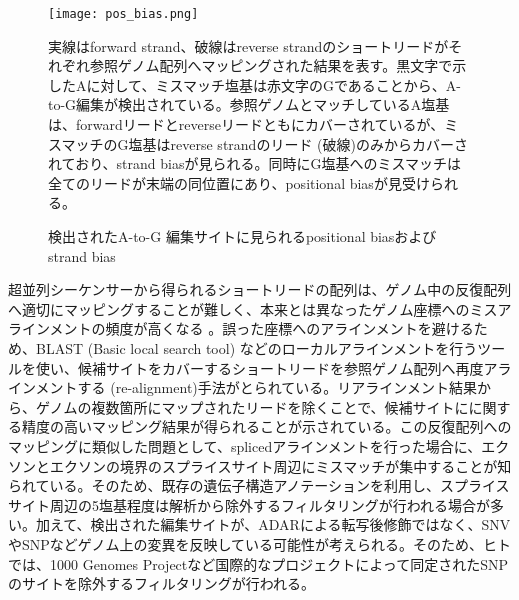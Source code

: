 \begin{figure}[!h]
	\begin{center}
		\texttt{[image: pos\_bias.png]}
	\end{center}
	\caption{検出されたA-to-G 編集サイトに見られるpositional biasおよびstrand bias}
	\begin{flushleft}
		\small{実線はforward strand、破線はreverse strandのショートリードがそれぞれ参照ゲノム配列へマッピングされた結果を表す。黒文字で示したAに対して、ミスマッチ塩基は赤文字のGであることから、A-to-G編集が検出されている。参照ゲノムとマッチしているA塩基は、forwardリードとreverseリードともにカバーされているが、ミスマッチのG塩基はreverse strandのリード (破線)のみからカバーされており、strand biasが見られる。同時にG塩基へのミスマッチは全てのリードが末端の同位置にあり、positional biasが見受けられる。}
	\end{flushleft}
	\label{fig:positional_bias}
\end{figure}

超並列シーケンサーから得られるショートリードの配列は、ゲノム中の反復配列へ適切にマッピングすることが難しく、本来とは異なったゲノム座標へのミスアラインメントの頻度が高くなる \citep{pmid22022455}。誤った座標へのアラインメントを避けるため、BLAST (Basic local search tool) \citep{altschul1990basic}などのローカルアラインメントを行うツールを使い、候補サイトをカバーするショートリードを参照ゲノム配列へ再度アラインメントする (re-alignment)手法がとられている。リアラインメント結果から、ゲノムの複数箇所にマップされたリードを除くことで、候補サイトにに関する精度の高いマッピング結果が得られることが示されている。この反復配列へのマッピングに類似した問題として、splicedアラインメントを行った場合に、エクソンとエクソンの境界のスプライスサイト周辺にミスマッチが集中することが知られている。そのため、既存の遺伝子構造アノテーションを利用し、スプライスサイト周辺の5塩基程度は解析から除外するフィルタリングが行われる場合が多い。加えて、検出された編集サイトが、ADARによる転写後修飾ではなく、SNVやSNPなどゲノム上の変異を反映している可能性が考えられる。そのため、ヒトでは、1000 Genomes Projectなど国際的なプロジェクトによって同定されたSNPのサイトを除外するフィルタリングが行われる。

